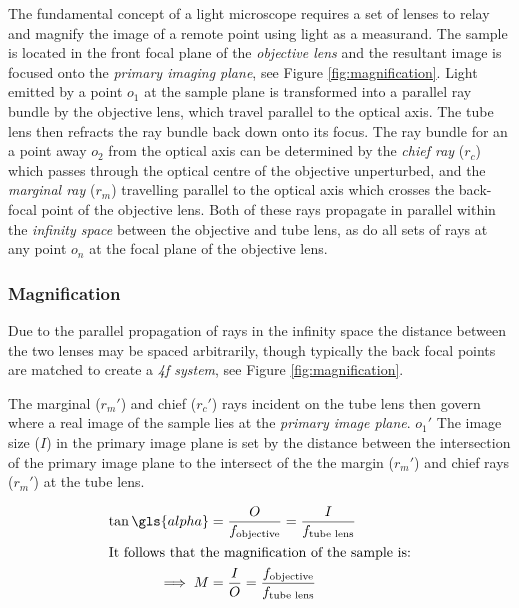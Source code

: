 The fundamental concept of a light microscope requires a set of lenses to relay and magnify the image of a remote point using light as a measurand.
The sample is located in the front focal plane of the \emph{\gls{objective lens}} and the resultant image is focused onto the \emph{\gls{primary imaging plane}}, see Figure \ref{fig:magnification}.
Light emitted by a point $o_1$ at the sample plane is transformed into a parallel ray bundle by the \gls{objective lens}, which travel parallel to the optical axis.
The tube lens then refracts the ray bundle back down onto its focus.
The ray bundle for an a point away $o_2$ from the optical axis can be determined by the \emph{chief ray} ($r_c$) which passes through the optical centre of the objective unperturbed, and the \emph{marginal ray} ($r_m$) travelling parallel to the optical axis which crosses the back-focal point of the \gls{objective lens}.
Both of these rays propagate in parallel within the \emph{infinity space} between the objective and tube lens, as do all sets of rays at any point $o_n$ at the focal plane of the \gls{objective lens}.

\subsubsection{Magnification}

Due to the parallel propagation of rays in the infinity space the distance between the two lenses may be spaced arbitrarily, though typically the back focal points are matched to create a \emph{\gls{4f} system}, see Figure \ref{fig:magnification}.

The marginal ($r_m'$) and chief ($r_c'$) rays incident on the tube lens then govern where a real image of the sample lies at the \emph{primary image plane}. %
$o_1'$
The image size ($I$) in the primary image plane is set by the distance between the intersection of the primary image plane to the intersect of the the margin ($r_m'$) and chief rays ($r_m'$) at the tube lens.


\begin{align}
    \tan \gls{alpha} &= \frac{O}{f_{\text{objective}}} =  \frac{I}{f_{\text{tube lens}}} \\
    \intertext{It follows that the magnification of the sample is:}
    \implies M &= \frac{I}{O} = \frac{f_{\text{objective}}}
{f_{\text{tube lens}}}
\end{align}

